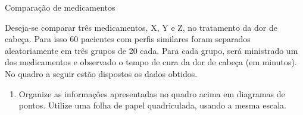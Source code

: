 \label{\detokenize{PE103-0:ativ-2-comparacao-de-medicamentos}}
\begin{task}{ Comparação de medicamentos}

Deseja-se comparar três medicamentos, X, Y e Z, no tratamento da dor de cabeça. Para isso 60 pacientes com perfis similares foram separados aleatoriamente em três grupos de 20 cada. Para cada grupo,  será ministrado um dos medicamentos e observado o tempo de cura da dor de cabeça (em minutos). No quadro a seguir estão dispostos os dados obtidos.
\label{\detokenize{PE103-0:tabela-medicamentos}}

\begin{enumerate}
\item {} 
Organize as informações apresentadas no quadro acima em diagramas de pontos. Utilize uma folha de papel quadriculada, usando a mesma escala.


\end{enumerate}
\end{task}
